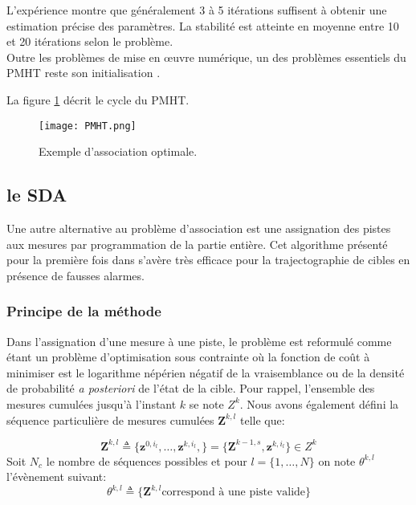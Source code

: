 \documentclass[10pt,french,a4paper]{report}
\begin{document}
\vspace{3mm}
L'expérience montre que généralement 3 à 5 itérations suffisent à  obtenir une estimation précise des paramètres. La stabilité est atteinte en moyenne entre 10 et 20 itérations selon le problème.\\

Outre les problèmes de mise 
en {\oe}uvre numérique, un des problèmes essentiels du \ac{PMHT} reste son 
initialisation \cite{willett2002pmht, wieneke2007pmht}. 

La figure \ref{fig:PMHT} décrit le cycle du \ac{PMHT}.

\begin{center}
\begin{figure}
\texttt{[image: PMHT.png]} 
\caption{Exemple d'association optimale.}
\label{fig:PMHT}
\end{figure}		 
\end{center}

  
\subsection{le \acf{SDA} }
   Une autre alternative au problème d'association est une assignation des pistes aux mesures par programmation de la partie entière. Cet algorithme présenté pour la première fois dans \cite{Pattipati1992} s'avère très efficace pour la trajectographie de cibles en présence de fausses alarmes.

\subsubsection{Principe de la méthode}
Dans l'assignation d'une mesure à une piste, le problème est reformulé comme étant un problème d'optimisation sous contrainte où la fonction de coût à minimiser est le logarithme népérien négatif de la vraisemblance ou de la densité de probabilité \textit{a posteriori} de l'état de la cible. 
Pour rappel, l'ensemble des mesures cumulées jusqu'à l'instant $k$ se note $Z^{k}$. Nous avons également défini la séquence particulière de mesures cumulées $\mathbf{Z}^{k,l}$ telle que:

\begin{equation}
\mathbf{Z}^{k,l} \triangleq \{ \mathbf{z}^{0,i_l},\ldots,\mathbf{z}^{k,i_l},\} =  \{ \mathbf{Z}^{k-1,s},\mathbf{z}^{k,i_l}\} \in Z^k
\end{equation} 
Soit $N_c$ le nombre de séquences possibles et pour $ l = \{1,\ldots,N\}$ on note $\theta^{k,l}$ l'évènement suivant:
\begin{equation}
 \theta^{k,l} \triangleq  \{ \mathbf{Z}^{k,l} \text{correspond à une piste valide}\}
\end{equation}
\end{document}
